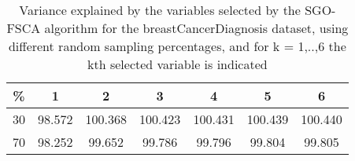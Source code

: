 \begin{table}
	\begin{center}
		\begin{tabular}{c c c c c c c}
			\% & 1 & 2 & 3 & 4 & 5 & 6 \\
			\hline
			30 & 98.572 & 100.368 & 100.423 & 100.431 & 100.439 & 100.440 \\
			70 & 98.252 & 99.652 & 99.786 & 99.796 & 99.804 & 99.805 \\
		\end{tabular}
	\end{center}
	\caption{Variance explained by the variables selected by the SGO-FSCA algorithm for the breastCancerDiagnosis dataset, using different random sampling percentages, and for k = 1,..,6 the kth selected variable is indicated}
\end{table}